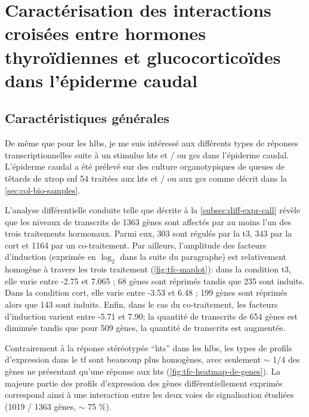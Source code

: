 \documentclass[../main.tex]{subfiles}
\begin{document}
\chapter{Caractérisation des interactions croisées entre hormones thyroïdiennes et glucocorticoïdes dans l'épiderme caudal}


\section{Caractéristiques générales}

	De même que pour les \glspl{hlb}, je me suis intéressé aux différents types de réponses transcriptionnelles suite à un stimulus \glspl{ht} et / ou \glspl{gc} dans l'épiderme caudal.
	L'épiderme caudal a été prélevé sur des culture organotypiques de queues de têtards de \gls{xtrop} \gls{snf} 54 traitées aux \glspl{ht} et / ou aux \glspl{gc} comme décrit dans la \autoref{sec:col-bio-samples}.
	\par
	L'analyse différentielle conduite telle que décrite à la \autoref{subsec:diff-expr-call} révèle que les niveaux de transcrits de 1363 gènes sont affectés par au moins l'un des trois traitements hormonaux.
	Parmi eux, 303 sont régulés par la \gls{t3}, 343 par la \gls{cort} et 1164 par un co-traitement.
	Par ailleurs, l'amplitude des facteurs d'induction (exprimée en $\log_2$ dans la suite du paragraphe) est relativement homogène à travers les trois traitement (\autoref{fig:tfc-maplot}):
	dans la condition \gls{t3}, elle varie entre -2.75 et 7.065 ; 68 gènes sont réprimés tandis que 235 sont induits.
	Dans la condition \gls{cort}, elle varie entre -3.53 et 6.48 ; 199 gènes sont réprimés alors que 143 sont induits.
	Enfin, dans le cas du co-traitement, les facteurs d'induction varient entre -5.71 et 7.90; la quantité de transcrits de 654 gènes est diminuée tandis que pour 509 gènes, la quantité de transcrits est augmentée.

	

	Contrairement à la réponse stéréotypée ``\glspl{ht}'' dans les \glspl{hlb}, les types de profils d'expression dans le \gls{tf} sont beaucoup plus homogènes, avec seulement $\sim$ 1/4 des gènes ne présentant qu'une réponse aux \glspl{ht} (\autoref{fig:tfc-heatmap-de-genes}).
	La majeure partie des profils d'expression des gènes différentiellement exprimés correspond ainsi à une interaction entre les deux voies de signalisation étudiées (1019 / 1363 gènes, $\sim$ 75 \%).

	
\end{document}
